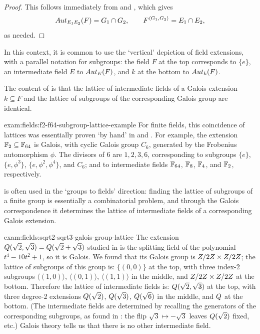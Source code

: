 \begin{proof}
  This follows immediately from  and
  , which gives
  \[
    Aut_{E_1 E_2}(F) = G_1 \cap G_2, \qquad F^{\langle G_1, G_2
      \rangle} = E_1 \cap E_2,
  \]
  as needed.
\end{proof}
In this context, it is common to use the `vertical' depiction of field
extensions, with a parallel notation for subgroups: the field $F$ at
the top corresponds to $\{e\}$, an intermediate field $E$ to
$Aut_E(F)$, and $k$ at the bottom to $Aut_k(F)$.

The content of  is that the lattice of
intermediate fields of a Galois extension $k \subseteq F$ and the
lattice of subgroups of the corresponding Galois group are identical.
\begin{exam}{}{exam:fields:f2-f64-subgroup-lattice-example}
  For finite fields, this coincidence of lattices was essentially
  proven `by hand' in  and
  . For example, the extension
  $\mathbb{F}_2 \subseteq \mathbb{F}_{64}$ is Galois, with cyclic Galois group $C_6$,
  generated by the Frobenius automorphism $\phi$. The divisors of $6$
  are $1, 2, 3, 6$, corresponding to subgroups $\{e\}$,
  $\{e, \phi^3\}$, $\{e, \phi^2, \phi^4\}$, and $C_6$; and to
  intermediate fields $\mathbb{F}_{64}$, $\mathbb{F}_8$, $\mathbb{F}_4$, and $\mathbb{F}_2$,
  respectively.
\end{exam}
 is often used in the `groups to fields'
direction: finding the lattice of subgroups of a finite group is
essentially a combinatorial problem, and through the Galois
correspondence it determines the lattice of intermediate fields of a
corresponding Galois extension.
\begin{exam}{}{exam:fields:sqrt2-sqrt3-galois-group-lattice}
  The extension $Q(\sqrt{2}, \sqrt{3}) = Q(\sqrt{2} + \sqrt{3})$
  studied in  is the splitting field of
  the polynomial $t^4 - 10t^2 + 1$, so it is Galois. We found that its
  Galois group is $Z/2Z \times Z/2Z$; the lattice of subgroups of
  this group is: $\{(0,0)\}$ at the top, with three index-2 subgroups
  $\langle(1,0)\rangle$, $\langle(0,1)\rangle$, $\langle(1,1)\rangle$
  in the middle, and $Z/2Z \times Z/2Z$ at the bottom. Therefore
  the lattice of intermediate fields is: $Q(\sqrt{2}, \sqrt{3})$ at
  the top, with three degree-2 extensions $Q(\sqrt{2})$,
  $Q(\sqrt{3})$, $Q(\sqrt{6})$ in the middle, and $Q$ at the
  bottom. (The intermediate fields are determined by recalling the
  generators of the corresponding subgroups, as found in
  : the flip $\sqrt{3} \mapsto -\sqrt{3}$
  leaves $Q(\sqrt{2})$ fixed, etc.) Galois theory tells us that there
  is no other intermediate field.
\end{exam}

